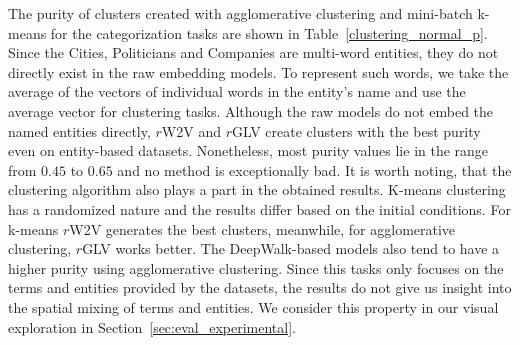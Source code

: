 The purity of clusters created with agglomerative clustering and mini-batch k-means for the categorization tasks are shown in Table~\ref{clustering_normal_p}. Since the Cities, Politicians and Companies are multi-word entities, they do not directly exist in the raw embedding models. To represent such words, we take the average of the vectors of individual words in the entity's name and use the average vector for clustering tasks. Although the raw models do not embed the named entities directly, $r$W2V and $r$GLV create clusters with the best purity even on entity-based datasets. Nonetheless, most purity values lie in the range from $0.45$ to $0.65$ and no method is exceptionally bad. It is worth noting, that the clustering algorithm also plays a part in the obtained results. K-means clustering has a randomized nature and the results differ based on the initial conditions. For k-means $r$W2V generates the best clusters, meanwhile, for agglomerative clustering, $r$GLV works better. The DeepWalk-based models also tend to have a higher purity using agglomerative clustering. Since this tasks only focuses on the terms and entities provided by the datasets, the results do not give us insight into the spatial mixing of terms and entities. We consider this property in our visual exploration in Section~\ref{sec:eval_experimental}.
